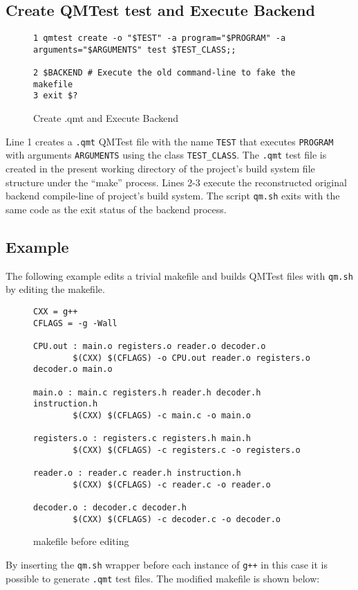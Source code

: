 \subsection{Create QMTest test and Execute Backend}

\begin{figure}[!ht]
{\scriptsize
\begin{verbatim}
1 qmtest create -o "$TEST" -a program="$PROGRAM" -a arguments="$ARGUMENTS" test $TEST_CLASS;;
                                                                                
2 $BACKEND # Execute the old command-line to fake the makefile
3 exit $?
\end{verbatim}
}
\caption{Create .qmt and Execute Backend}
\end{figure}

Line 1 creates a {\tt .qmt} QMTest file with the name {\tt TEST} that executes
{\tt PROGRAM} with arguments {\tt ARGUMENTS} using the class {\tt TEST\_CLASS}.
The {\tt .qmt} test file is created in the present working directory of the
project's build system file structure under the ``make'' process.
Lines 2-3 execute the reconstructed original backend compile-line of project's
build system. The script {\tt qm.sh} exits with the same code as the exit
status of the backend process.

\subsection{Example}

The following example edits a trivial makefile and builds QMTest files with
{\tt qm.sh} by editing the makefile.

\begin{figure}[!ht]
{\scriptsize
\begin{verbatim}
CXX = g++
CFLAGS = -g -Wall

CPU.out : main.o registers.o reader.o decoder.o
        $(CXX) $(CFLAGS) -o CPU.out reader.o registers.o decoder.o main.o
                                                                                
main.o : main.c registers.h reader.h decoder.h instruction.h
        $(CXX) $(CFLAGS) -c main.c -o main.o
                                                                                
registers.o : registers.c registers.h main.h
        $(CXX) $(CFLAGS) -c registers.c -o registers.o
                                                                                
reader.o : reader.c reader.h instruction.h
        $(CXX) $(CFLAGS) -c reader.c -o reader.o
                                                                                
decoder.o : decoder.c decoder.h
        $(CXX) $(CFLAGS) -c decoder.c -o decoder.o
\end{verbatim}
}
\caption{makefile before editing}
\end{figure}
By inserting the {\tt qm.sh} wrapper before each instance of {\tt g++} in this
case it is possible to generate {\tt .qmt} test files. The modified makefile is
shown below:

